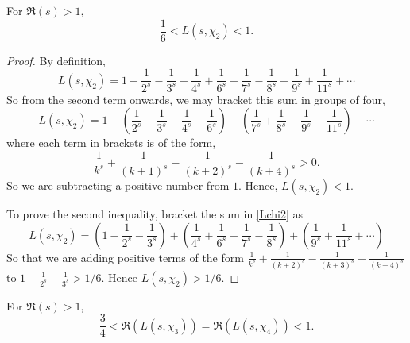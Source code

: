 \documentclass{unswmaths}
\begin{document}
    \begin{lemma}
    \label{charOrth}
        For $\Re(s) > 1$, 
        \begin{equation*}
            \frac{1}{6} < L(s,\chi_2) < 1.
        \end{equation*}
    \end{lemma}
    \begin{proof}
        By definition,
        \begin{equation}
        \label{Lchi2}
            L(s,\chi_2) = 1-\frac{1}{2^s}-\frac{1}{3^s}+\frac{1}{4^s}+\frac{1}{6^s}-\frac{1}{7^s}-\frac{1}{8^s}+\frac{1}{9^s}+\frac{1}{11^s}+\cdots
        \end{equation}
        So from the second term onwards, we may bracket this sum in groups of four,
        \begin{equation*}
            L(s,\chi_2) = 1-\left(\frac{1}{2^s}+\frac{1}{3^s}-\frac{1}{4^s}-\frac{1}{6^s}\right)-\left(\frac{1}{7^s}+\frac{1}{8^s}-\frac{1}{9^s}-\frac{1}{11^s}\right)-\cdots
        \end{equation*}
        where each term in brackets is of the form,
        \begin{equation*}
            \frac{1}{k^s}+\frac{1}{(k+1)^s}-\frac{1}{(k+2)^s}-\frac{1}{(k+4)^s} > 0.
        \end{equation*}
        So we are subtracting a positive number from $1$. Hence, $L(s,\chi_2) < 1$. 
        
        To prove the second inequality, bracket the sum in \ref{Lchi2} as
        \begin{equation*}
            L(s,\chi_2) = \left(1-\frac{1}{2^s}-\frac{1}{3^s}\right)+\left(\frac{1}{4^s}+\frac{1}{6^s}-\frac{1}{7^s}-\frac{1}{8^s}\right)+\left(\frac{1}{9^s}+\frac{1}{11^s}+\cdots\right)
        \end{equation*}
        So that we are adding positive terms of the form $\frac{1}{k^s}+\frac{1}{(k+2)^s}-\frac{1}{(k+3)^s}-\frac{1}{(k+4)^s}$ to $1-\frac{1}{2^s}-\frac{1}{3^s} > 1/6$. Hence $L(s,\chi_2) > 1/6$.
    \end{proof}
    \begin{lemma}
        For $\Re(s) > 1$,
        \begin{equation*}
            \frac{3}{4} < \Re(L(s,\chi_3)) = \Re(L(s,\chi_4)) < 1.
        \end{equation*}
    \end{lemma}
\end{document}
